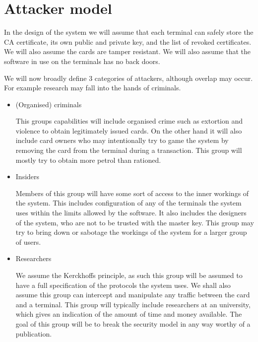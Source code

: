 \section*{Attacker model}

In the design of the system we will assume that each terminal can safely store the CA certificate, its own public and private key, and the list of revoked certificates. We will also assume the cards are tamper resistant. We will also assume that the software in use on the terminals has no back doors.

We will now broadly define $3$ categories of attackers, although overlap may occur. For example research may fall into the hands of criminals. 

\begin{itemize}

\item (Organised) criminals

This groups capabilities will include organised crime such as extortion and violence to obtain legitimately issued cards. On the other hand it will also include card owners who may intentionally try to game the system by removing the card from the terminal during a transaction. This group will mostly try to obtain more petrol than rationed.

\item Insiders

Members of this group will have some sort of access to the inner workings of the system. This includes configuration of any of the terminals the system uses within the limits allowed by the software. It also includes the designers of the system, who are not to be trusted with the master key. This group may try to bring down or sabotage the workings of the system for a larger group of users.

\item Researchers

We assume the Kerckhoffs principle, as such this group will be assumed to have a full specification of the protocols the system uses. We shall also assume this group can intercept and manipulate any traffic between the card and a terminal. This group will typically include researchers at an university, which gives an indication of the amount of time and money available. The goal of this group will be to break the security model in any way worthy of a publication.
 
\end{itemize}